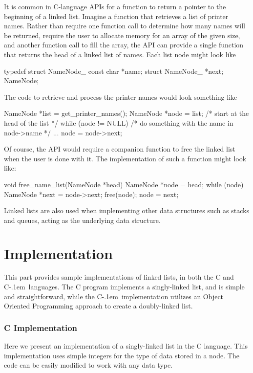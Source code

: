 \documentclass{article}
\newcommand{\Cpp}{\mbox{C\kern-.1em\raisebox{.35ex}{\smaller{\smaller{+\kern-0.05em+}}}}}
\begin{document}
  It is common in C-language APIs for a function to return a pointer to the beginning of a linked list. Imagine a function that retrieves a list of printer names. Rather than require one function call to determine how many names will be returned, require the user to allocate memory for an array of the given size, and another function call to fill the array, the API can provide a single function that returns the head of a linked list of names. Each list node might look like
  \begin{lstc}[firstnumber=1]
typedef struct NameNode_ {
  const char        *name;
  struct NameNode_  *next;
} NameNode;\end{lstc}
  The code to retrieve and process the printer names would look something like
  \begin{lstc}[firstnumber=1]
NameNode *list = get_printer_names();
NameNode *node = list;  /* start at the head of the list */
while (node != NULL) {
  /* do something with the name in node->name */
  ...
  node = node->next;
}\end{lstc}
  Of course, the API would require a companion function to free the linked list when the user is done with it. The implementation of such a function might look like:
  \begin{lstc}[firstnumber=1]
void free_name_list(NameNode *head) {
  NameNode *node = head;
  while (node) {
    NameNode *next = node->next;
    free(node);
    node = next;
  }
}\end{lstc}
  Linked lists are also used when implementing other data structures such as stacks and queues, acting as the underlying data structure.

  \part{Implementation}\label{part:implementation}
  This part provides sample implementations of linked lists, in both the C and \Cpp\ languages. The C program implements a singly-linked list, and is simple and straightforward, while the \Cpp\ implementation utilizes an Object Oriented Programming approach to create a doubly-linked list.
  \section{C Implementation}
  \label{sect:C_implementation}
  Here we present an implementation of a singly-linked list in the C language. This implementation uses simple integers for the type of data stored in a node. The code can be easily modified to work with any data type.
\end{document}
